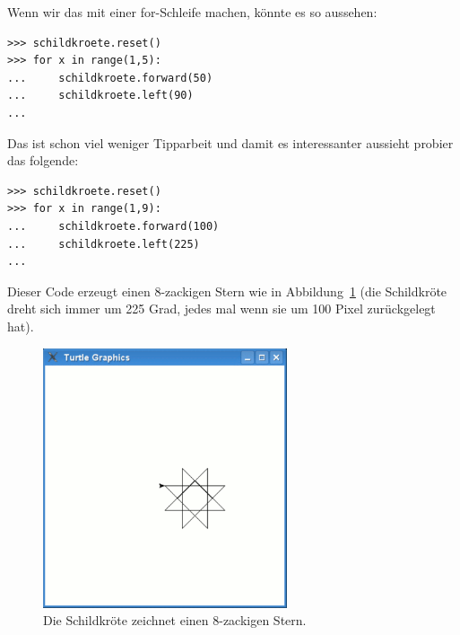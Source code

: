 \noindent
Wenn wir das mit einer for-Schleife machen, könnte es so aussehen:

\begin{Verbatim}[frame=single]
>>> schildkroete.reset()
>>> for x in range(1,5):
...     schildkroete.forward(50)
...     schildkroete.left(90)
...
\end{Verbatim}

Das ist schon viel weniger Tipparbeit und damit es interessanter aussieht probier das folgende:

\begin{Verbatim}[frame=single]
>>> schildkroete.reset()
>>> for x in range(1,9):
...     schildkroete.forward(100)
...     schildkroete.left(225)
...
\end{Verbatim}

Dieser Code erzeugt einen 8-zackigen Stern wie in Abbildung~\ref{fig20} (die Schildkröte dreht sich immer um 225 Grad, jedes mal wenn sie um 100 Pixel zurückgelegt hat).

\begin{figure}
\begin{center}
\includegraphics[width=72mm]{images/figure20}
\end{center}
\caption{Die Schildkröte zeichnet einen 8-zackigen Stern.}\label{fig20}
\end{figure}

